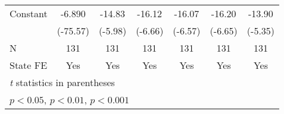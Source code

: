 {\begin{tabular}{l*{6}{c}}
\addlinespace
Constant            &      -6.890\sym{***}&      -14.83\sym{***}&      -16.12\sym{***}&      -16.07\sym{***}&      -16.20\sym{***}&      -13.90\sym{***}\\
                    &    (-75.57)         &     (-5.98)         &     (-6.66)         &     (-6.57)         &     (-6.65)         &     (-5.35)         \\
\midrule
N                   &         131         &         131         &         131         &         131         &         131         &         131         \\
State FE            &         Yes         &         Yes         &         Yes         &         Yes         &         Yes         &         Yes         \\
\bottomrule
\multicolumn{7}{l}{\footnotesize \textit{t} statistics in parentheses}\\
\multicolumn{7}{l}{\footnotesize \sym{*} \(p<0.05\), \sym{**} \(p<0.01\), \sym{***} \(p<0.001\)}\\
\end{tabular}
}
